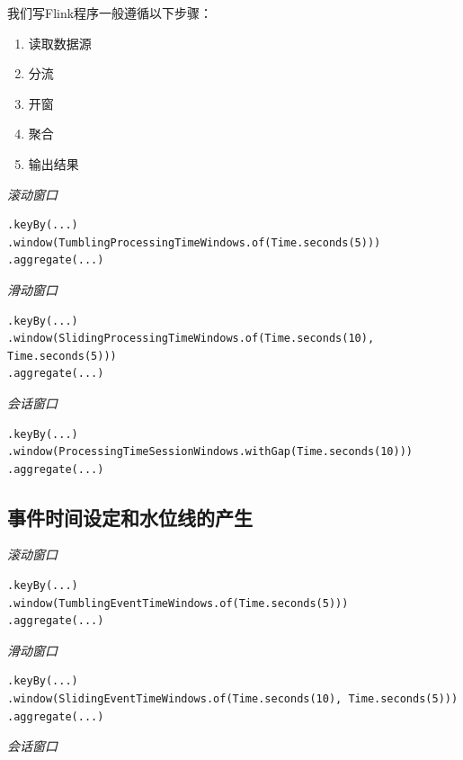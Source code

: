 \documentclass[cn,11pt,chinese]{elegantbook}
\begin{document}
我们写Flink程序一般遵循以下步骤：

\begin{enumerate}
    \item 读取数据源
    \item 分流
    \item 开窗
    \item 聚合
    \item 输出结果
\end{enumerate}

\textit{滚动窗口}

\begin{verbatim}
.keyBy(...)
.window(TumblingProcessingTimeWindows.of(Time.seconds(5)))
.aggregate(...)
\end{verbatim}

\textit{滑动窗口}

\begin{verbatim}
.keyBy(...)
.window(SlidingProcessingTimeWindows.of(Time.seconds(10), Time.seconds(5)))
.aggregate(...)
\end{verbatim}

\textit{会话窗口}

\begin{verbatim}
.keyBy(...)
.window(ProcessingTimeSessionWindows.withGap(Time.seconds(10)))
.aggregate(...)
\end{verbatim}

\subsection{事件时间设定和水位线的产生}

\textit{滚动窗口}

\begin{verbatim}
.keyBy(...)
.window(TumblingEventTimeWindows.of(Time.seconds(5)))
.aggregate(...)
\end{verbatim}

\textit{滑动窗口}

\begin{verbatim}
.keyBy(...)
.window(SlidingEventTimeWindows.of(Time.seconds(10), Time.seconds(5)))
.aggregate(...)
\end{verbatim}

\textit{会话窗口}
\end{document}
